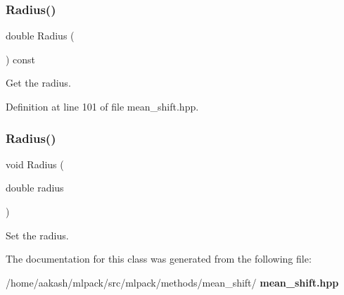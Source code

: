 \subsubsection{Radius()\hspace{0.1cm}{\footnotesize\ttfamily [1/2]}}
{\footnotesize\ttfamily double Radius (\begin{DoxyParamCaption}{ }\end{DoxyParamCaption}) const\hspace{0.3cm}{\ttfamily [inline]}}



Get the radius. 



Definition at line 101 of file mean\+\_\+shift.\+hpp.

\mbox{\label{classmlpack_1_1meanshift_1_1MeanShift_ae12840857c3632026e7c513e0f19e52d}} 
\subsubsection{Radius()\hspace{0.1cm}{\footnotesize\ttfamily [2/2]}}
{\footnotesize\ttfamily void Radius (\begin{DoxyParamCaption}\item[{double}]{radius }\end{DoxyParamCaption})}



Set the radius. 



The documentation for this class was generated from the following file\+:\begin{DoxyCompactItemize}
\item 
/home/aakash/mlpack/src/mlpack/methods/mean\+\_\+shift/\textbf{ mean\+\_\+shift.\+hpp}\end{DoxyCompactItemize}
